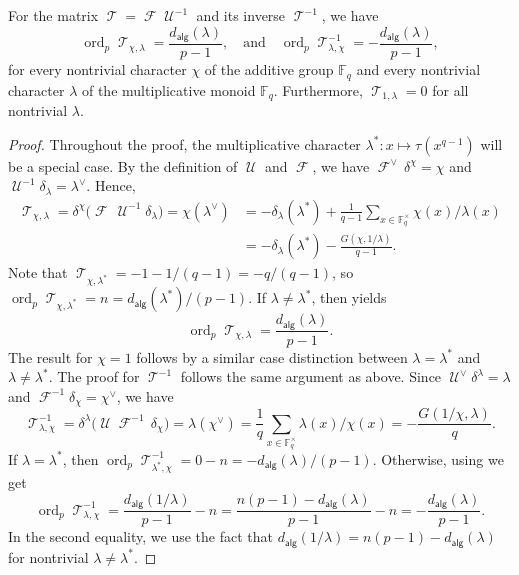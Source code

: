 \documentclass[12pt]{article}
\newcommand{\F}{\mathbb{F}}
\newcommand{\dual}{\vee}
\DeclareMathOperator{\ord}{ord}
\DeclareMathOperator{\FT}{\mathscr{F}}
\DeclareMathOperator{\UT}{\mathscr{U}}
\DeclareMathOperator{\TT}{\mathscr{T}}
\newcommand{\adeg}[1]{d_{\mathsf{alg}}(#1)}
\begin{document}
\begin{lemma} \label{lem:baseConversion}
For the matrix $\TT = \FT \UT^{-1}$ and its inverse $\TT^{-1}$, we have
\begin{equation*}
\ord_p \TT_{\chi, \lambda} =  \frac{\adeg{\lambda}}{p - 1},
\quad\mathrm{and}\quad
\ord_p \TT^{-1}_{\lambda, \chi} = -\frac{\adeg{\lambda}}{p - 1},
\end{equation*}
for every nontrivial character $\chi$ of the additive group $\F_q$ and every nontrivial character $\lambda$ of the multiplicative monoid $\F_q$.
Furthermore, $\TT_{1, \lambda} = 0$ for all nontrivial $\lambda$.
\end{lemma}
\begin{proof}
Throughout the proof, the multiplicative character $\lambda^* : x \mapsto \tau(x^{q - 1})$ will be a special case.
By the definition of $\UT$ and $\FT$, we have $\FT^\dual\,\delta^\chi = \chi$ and $\UT^{-1} \delta_\lambda = \lambda^\dual$. Hence,
\begin{align*}
\TT_{\chi, \lambda} = \delta^\chi\Big(\FT\,\UT^{-1}\delta_{\lambda}\Big) = \chi(\lambda^\dual)
&= -\delta_\lambda(\lambda^*) + \frac{1}{q - 1} \sum_{x \in \F_q^\times} \chi(x)/\lambda(x) \\
&= -\delta_\lambda(\lambda^*) - \frac{G(\chi, 1/\lambda)}{q - 1}.
\end{align*}
Note that $\TT_{\chi,\lambda^*} = - 1 -1 / (q - 1) = -q/(q-1)$, so $\ord_p \TT_{\chi,\lambda^*} = n = \adeg{\lambda^*}/(p-1)$.
If $\lambda \neq \lambda^*$, then  yields
\begin{equation*}
\ord_p \TT_{\chi, \lambda} = \frac{\adeg{\lambda}}{p - 1}.
\end{equation*}
The result for $\chi = 1$ follows by a similar case distinction between $\lambda = \lambda^*$ and $\lambda \neq \lambda^*$.
The proof for $\TT^{-1}$ follows the same argument as above. Since $\UT^\dual \delta^\lambda = \lambda$ and $\FT^{-1} \delta_\chi = \chi^\dual$, we have
\begin{equation*}
\TT^{-1}_{\lambda, \chi} = \delta^\lambda\Big(\UT \FT^{-1}\,\delta_{\chi}\Big) = \lambda(\chi^\dual) = \frac{1}{q} \sum_{x \in \F_q^\times} \lambda(x) / \chi(x) = -\frac{G(1/\chi, \lambda)}{q}.
\end{equation*}
If $\lambda = \lambda^*$, then $\ord_p \TT^{-1}_{\lambda^*, \chi} = 0 - n = -\adeg{\lambda} /(p - 1)$.
Otherwise, using  we get
\begin{equation*}
\ord_p \TT^{-1}_{\lambda, \chi} = \frac{\adeg{1/\lambda}}{p - 1} - n = \frac{n(p - 1) - \adeg{\lambda}}{p - 1} - n = -\frac{\adeg{\lambda}}{p - 1}.
\end{equation*}
In the second equality, we use the fact that $\adeg{1/\lambda} = n(p - 1) - \adeg{\lambda}$ for nontrivial $\lambda \neq \lambda^*$.
\end{proof}
\end{document}
